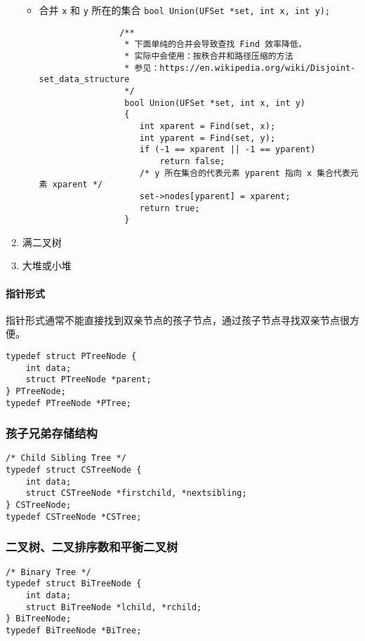 \documentclass{ctexart}
\begin{document}
\begin{enumerate}
\begin{itemize}
            \item 合并 \texttt{x}  和 \texttt{y} 所在的集合 \texttt{bool Union(UFSet *set, int x, int y);}
                \begin{verbatim}
                /**
                 * 下面单纯的合并会导致查找 Find 效率降低，
                 * 实际中会使用：按秩合并和路径压缩的方法
                 * 参见：https://en.wikipedia.org/wiki/Disjoint-set_data_structure
                 */
                 bool Union(UFSet *set, int x, int y)
                 {
                    int xparent = Find(set, x);
                    int yparent = Find(set, y);
                    if (-1 == xparent || -1 == yparent)
                        return false;
                    /* y 所在集合的代表元素 yparent 指向 x 集合代表元素 xparent */
                    set->nodes[yparent] = xparent;
                    return true;
                 }
                \end{verbatim}
        \end{itemize}
    \item 满二叉树
    \item 大堆或小堆 %
\end{enumerate}

\paragraph{指针形式} 指针形式通常不能直接找到双亲节点的孩子节点，通过孩子节点寻找双亲节点很方便。
\begin{verbatim}
typedef struct PTreeNode {
    int data;
    struct PTreeNode *parent;
} PTreeNode;
typedef PTreeNode *PTree;
\end{verbatim}

\subsubsection{孩子兄弟存储结构}
\begin{verbatim}
/* Child Sibling Tree */
typedef struct CSTreeNode {
    int data;
    struct CSTreeNode *firstchild, *nextsibling;
} CSTreeNode;
typedef CSTreeNode *CSTree;
\end{verbatim}

\subsubsection{二叉树、二叉排序数和平衡二叉树}
\begin{verbatim}
/* Binary Tree */
typedef struct BiTreeNode {
    int data;
    struct BiTreeNode *lchild, *rchild;
} BiTreeNode;
typedef BiTreeNode *BiTree;
\end{verbatim}
\end{document}
